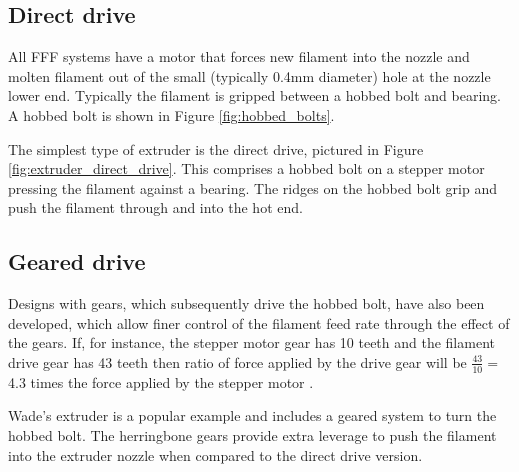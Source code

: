 \subsection{Direct drive}

All FFF systems have a motor that forces new filament into the nozzle and molten filament out of the small (typically 0.4mm diameter) hole at the nozzle lower end. Typically the filament is gripped between a hobbed bolt and bearing. A hobbed bolt is shown in Figure \ref{fig:hobbed_bolts}. 


The simplest type of extruder is the direct drive, pictured in Figure \ref{fig:extruder_direct_drive}. This comprises a hobbed bolt on a stepper motor pressing the filament against a bearing. The ridges on the hobbed bolt grip and push the filament through and into the hot end. 

\subsection{Geared drive}

Designs with gears, which subsequently drive the hobbed bolt, have also been developed, which allow finer control of the filament feed rate through the effect of the gears. If, for instance, the stepper motor gear has 10 teeth and the filament drive gear has 43 teeth then ratio of force applied by the drive gear will be $\tfrac{43}{10} = $4.3 times the force applied by the stepper motor \cite{gears}. 

Wade's extruder is a popular example and includes a geared system to turn the hobbed bolt. The herringbone gears provide extra leverage to push the filament into the extruder nozzle when compared to the direct drive version. 


